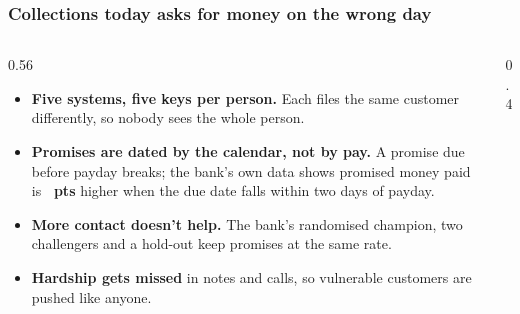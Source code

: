 \documentclass[aspectratio=169,10pt]{beamer}
\begin{document}
\begin{frame}
  \frametitle{Collections today asks for money on the wrong day}
  \begin{columns}[T]
    \begin{column}{0.56\textwidth}
      \begin{itemize}\setlength\itemsep{0.3em}\small
        \item \textbf{Five systems, five keys per person.} Each files the same customer differently, so nobody sees
          the whole person.
        \item \textbf{Promises are dated by the calendar, not by pay.} A promise due before payday breaks; the bank's own
          data shows promised money paid is \textbf{\KpayMoney\ pts} higher when the due date falls within two days of payday.
        \item \textbf{More contact doesn't help.} The bank's randomised champion, two challengers and a hold-out keep
          promises at the same rate.
        \item \textbf{Hardship gets missed} in notes and calls, so vulnerable customers are pushed like anyone.
      \end{itemize}
    \end{column}
    \begin{column}{0.4\textwidth}
    \end{column}
  \end{columns}
\end{frame}
\end{document}

